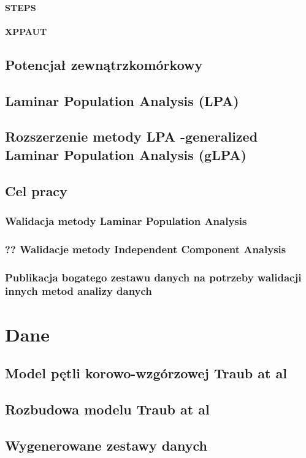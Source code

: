 \documentclass[a4paper,12pt,polish]{book}
\begin{document}
\subsubsection{STEPS}
\subsubsection{XPPAUT}
\section{Potencjał zewnątrzkomórkowy}
\section{Laminar Population Analysis (LPA)}
\section{Rozszerzenie metody LPA -generalized Laminar Population Analysis (gLPA)}
\section{Cel pracy}
\subsection{Walidacja metody Laminar Population Analysis}
\subsection{??  Walidacje metody Independent Component Analysis}
\subsection{Publikacja bogatego zestawu danych na potrzeby walidacji innych metod analizy danych}


\chapter{Dane}
\section{Model pętli korowo-wzgórzowej Traub at al}
\section{Rozbudowa modelu Traub at al}
\section{Wygenerowane zestawy danych}
\end{document}
